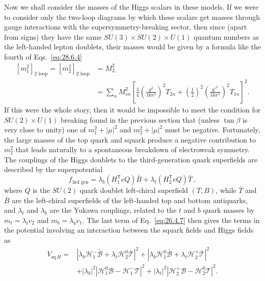 Now we shall consider the masses of the Higgs scalars in these models. If
we were to consider only the two-loop diagrams by which these scalars get
masses through gauge interactions with the supersymmetry-breaking sector,
then since (apart from signs) they have the same
\(SU(3)\times SU(2)\times U(1)\) quantum numbers as the
left-handed lepton doublets, their masses would be given by a formula like
the fourth of Eqs.~\eqref{eq:28.6.4}
\begin{equation}
  \begin{aligned}
    [m_1^2]_{\text{2 loop}}=[m_2^2]_{\text{2 loop}}
    &=M_L^2\\
    &=\sum_nM_{sn}^2
      \left[
        \frac{3}{4}\left(\frac{g^2}{16\pi^2}\right)^2T_{2n}
        +\left(\frac{1}{2}\right)^2
         \left(\frac{g'^2}{16\pi^2}\right)^2T_{1n}
      \right]^2 .
  \end{aligned}
  \tag{28.6.23}\label{eq:28.6.23}
\end{equation}
If this were the whole story, then it would be impossible to meet the
condition for \(SU(2)\times U(1)\) breaking found in the previous
section that (unless \(\tan\beta\) is very close to unity) one of
\(m_1^2+\lvert\mu\rvert^2\) and \(m_2^2+\lvert\mu\rvert^2\) must be
negative. Fortunately, the large masses of the top quark and squark
produce a negative contribution to \(m_2^2\) that leads naturally to a
spontaneous breakdown of electroweak symmetry. The couplings of the Higgs
doublets to the third-generation quark superfields are described by the
superpotential
\begin{equation}
  f_{\text{3rd gen}}
  =\lambda_b(H_1^{\mathsf T}eQ)\bar B
   +\lambda_t(H_2^{\mathsf T}eQ)\bar T\,,
  \tag{28.6.24}\label{eq:28.6.24}
\end{equation}
where \(Q\) is the \(SU(2)\) quark doublet left-chiral superfield
\((T,B)\), while \(\bar T\) and \(\bar B\) are the left-chiral
superfields of the left-handed top and bottom antiquarks, and
\(\lambda_t\) and \(\lambda_b\) are the Yukawa couplings, related to the
\(t\) and \(b\) quark masses by \(m_t=\lambda_tv_2\) and
\(m_b=\lambda_bv_1\). The last term of Eq.~\eqref{eq:26.4.7} then gives
the terms in the potential involving an interaction between the squark
fields and Higgs fields as
\begin{equation}
  \begin{aligned}
    V_{\mathrm{sq}\,H}={}&
      \left|
        \lambda_b\mathcal{H}_1^-\bar{\mathcal B}
        +\lambda_t\mathcal{H}_2^0\bar{\mathcal T}
      \right|^2
      +\left|
        \lambda_b\mathcal{H}_1^0\bar{\mathcal B}
        +\lambda_t\mathcal{H}_2^+\bar{\mathcal T}
      \right|^2\\
      &+\lvert\lambda_b\rvert^2
      \left|\mathcal{H}_1^0\mathcal B-\mathcal{H}_1^-\mathcal T\right|^2
      +\lvert\lambda_t\rvert^2
      \left|\mathcal{H}_2^+\mathcal B-\mathcal{H}_2^0\mathcal T\right|^2 .
  \end{aligned}
  \tag{28.6.25}\label{eq:28.6.25}
\end{equation}
